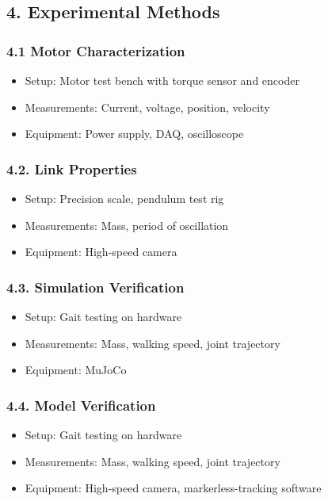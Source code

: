 \documentclass[12pt]{article}
\begin{document}
\subsection*{4. Experimental Methods}

\subsubsection*{4.1 Motor Characterization}
\begin{itemize}
    \item Setup: Motor test bench with torque sensor and encoder
    \item Measurements: Current, voltage, position, velocity
    \item Equipment: Power supply, DAQ, oscilloscope
\end{itemize}

\subsubsection*{4.2. Link Properties}
\begin{itemize}
    \item Setup: Precision scale, pendulum test rig
    \item Measurements: Mass, period of oscillation
    \item Equipment: High-speed camera
\end{itemize}

\subsubsection*{4.3. Simulation Verification}
\begin{itemize}
    \item Setup: Gait testing on hardware
    \item Measurements: Mass, walking speed, joint trajectory
    \item Equipment: MuJoCo
\end{itemize}

\subsubsection*{4.4. Model Verification}
\begin{itemize}
    \item Setup: Gait testing on hardware
    \item Measurements: Mass, walking speed, joint trajectory
    \item Equipment: High-speed camera, markerless-tracking software
\end{itemize}
\end{document}
